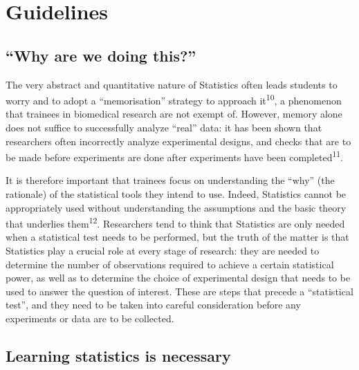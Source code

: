 \documentclass[smallextended]{svjour3}       %
\begin{document}
\hypertarget{guidelines}{%
\section{Guidelines}\label{guidelines}}

\hypertarget{why-are-we-doing-this}{%
\subsection{``Why are we doing this?''}\label{why-are-we-doing-this}}

The very abstract and quantitative nature of Statistics often leads
students to worry and to adopt a ``memorisation'' strategy to approach
it\textsuperscript{10}, a phenomenon that trainees in biomedical
research are not exempt of. However, memory alone does not suffice to
successfully analyze ``real'' data: it has been shown that researchers
often incorrectly analyze experimental designs, and checks that are to
be made before experiments are done after experiments have been
completed\textsuperscript{11}.

It is therefore important that trainees focus on understanding the
``why'' (the rationale) of the statistical tools they intend to use.
Indeed, Statistics cannot be appropriately used without understanding
the assumptions and the basic theory that underlies
them\textsuperscript{12}. Researchers tend to think that Statistics are
only needed when a statistical test needs to be performed, but the truth
of the matter is that Statistics play a crucial role at every stage of
research: they are needed to determine the number of observations
required to achieve a certain statistical power, as well as to determine
the choice of experimental design that needs to be used to answer the
question of interest. These are steps that precede a ``statistical
test'', and they need to be taken into careful consideration before any
experiments or data are to be collected.

\hypertarget{learning-statistics-is-necessary}{%
\subsection{Learning statistics is
necessary}\label{learning-statistics-is-necessary}}
\end{document}
